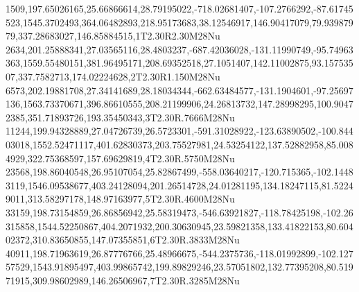 1509,197.65026165,25.66866614,28.79195022,-718.02681407,-107.2766292,-87.61745523,1545.3702493,364.06482893,218.95173683,38.12546917,146.90417079,79.93987979,337.28683027,146.85884515,1T2.30R2.30M28Nu
2634,201.25888341,27.03565116,28.4803237,-687.42036028,-131.11990749,-95.74963363,1559.55480151,381.96495171,208.69352518,27.1051407,142.11002875,93.15753507,337.7582713,174.02224628,2T2.30R1.150M28Nu
6573,202.19881708,27.34141689,28.18034344,-662.63484577,-131.1904601,-97.25697136,1563.73370671,396.86610555,208.21199906,24.26813732,147.28998295,100.90472385,351.71893726,193.35450343,3T2.30R.7666M28Nu
11244,199.94328889,27.04726739,26.5723301,-591.31028922,-123.63890502,-100.84403018,1552.52471117,401.62830373,203.75527981,24.53254122,137.52882958,85.0084929,322.75368597,157.69629819,4T2.30R.5750M28Nu
23568,198.86040548,26.95107054,25.82867499,-558.03640217,-120.715365,-102.14483119,1546.09538677,403.24128094,201.26514728,24.01281195,134.18247115,81.52249011,313.58297178,148.97163977,5T2.30R.4600M28Nu
33159,198.73154859,26.86856942,25.58319473,-546.63921827,-118.78425198,-102.26315858,1544.52250867,404.2071932,200.30630945,23.59821358,133.41822153,80.60402372,310.83650855,147.07355851,6T2.30R.3833M28Nu
40911,198.71963619,26.87776766,25.48966675,-544.2375736,-118.01992899,-102.12757529,1543.91895497,403.99865742,199.89829246,23.57051802,132.77395208,80.51971915,309.98602989,146.26506967,7T2.30R.3285M28Nu
